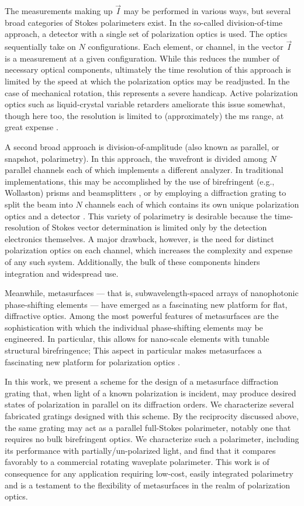 \documentclass[footinbib,aps,prl,twocolumn,superscriptaddress]{revtex4-1}
\begin{document}
The measurements making up $\vec{I}$ may be performed in various ways, but several broad categories of Stokes polarimeters exist. In the so-called division-of-time approach, a detector with a single set of polarization optics is used. The optics sequentially take on $N$ configurations. Each element, or channel, in the vector $\vec{I}$ is a measurement at a given configuration. While this reduces the number of necessary optical components, ultimately the time resolution of this approach is limited by the speed at which the polarization optics may be readjusted. In the case of mechanical rotation, this represents a severe handicap. Active polarization optics such as liquid-crystal variable retarders ameliorate this issue somewhat, though here too, the resolution is limited to (approximately) the ms range, at great expense \cite{Snik2014}.

A second broad approach is division-of-amplitude (also known as parallel, or snapshot, polarimetry). In this approach, the wavefront is divided among $N$ parallel channels each of which implements a different analyzer. In traditional implementations, this may be accomplished by the use of birefringent (e.g., Wollaston) prisms and beamsplitters \cite{Azzam1982}, or by employing a diffraction grating to split the beam into $N$ channels each of which contains its own unique polarization optics and a detector \cite{Azzam1993, Cui1996}. This variety of polarimetry is desirable because the time-resolution of Stokes vector determination is limited only by the detection electronics themselves. A major drawback, however, is the need for distinct polarization optics on each channel, which increases the complexity and expense of any such system. Additionally, the bulk of these components hinders integration and widespread use.

Meanwhile, metasurfaces \cite{Yu2011} --- that is, subwavelength-spaced arrays of nanophotonic phase-shifting elements --- have emerged as a fascinating new platform for flat, diffractive optics. Among the most powerful features of metasurfaces are the sophistication with which the individual phase-shifting elements may be engineered. In particular, this allows for nano-scale elements with tunable structural birefringence; This aspect in particular makes metasurfaces a fascinating new platform for polarization optics \cite{Arbabi2015, Mueller2017}.

In this work, we present a scheme for the design of a metasurface diffraction grating that, when light of a known polarization is incident, may produce desired states of polarization in parallel on its diffraction orders. We characterize several fabricated gratings designed with this scheme. By the reciprocity discussed above, the same grating may act as a parallel full-Stokes polarimeter, notably one that requires no bulk birefringent optics. We characterize such a polarimeter, including its performance with partially/un-polarized light, and find that it compares favorably to a commercial rotating waveplate polarimeter. This work is of consequence for any application requiring low-cost, easily integrated polarimetry and is a testament to the flexibility of metasurfaces in the realm of polarization optics.
\end{document}

